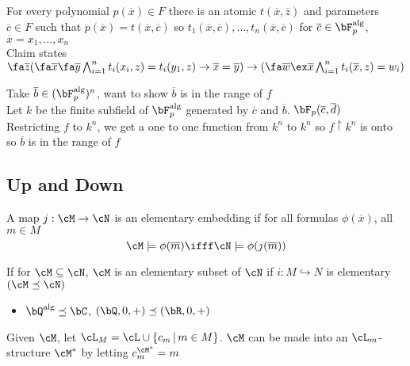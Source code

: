 \noindent
For every polynomial $p(\overline{x}) \in F$ there is an atomic $t(\overline{x}, \overline{z})$ and parameters $\overline{c} \in F$ such that $p(\overline{x}) = t(\overline{x}, \overline{c})$ so $t_1(\overline{x}, \overline{c}), \ldots, t_n(\overline{x}, \overline{c})$ for $\overline{c}\in \bF_p^{\text{alg}}$, $\overline{x} = x_1, \ldots, x_n$ \\
Claim states $\fa \overline{z}( \fa \overline{x} \fa \overline{y} \bigwedge_{i=1}^n t_i(x_i, z) = t_i(y_1, z) \to \overline{x} = \overline{y}) \to (\fa \overline{w} \ex \overline{x} \bigwedge_{i=1}^n t_i(\overline{x}, z)=w_i)$ 

\begin{pf}[Pf of Claim]
    Take $\overline{b} \in (\bF_p^{\text{alg}})^n$, want to show $\overline{b}$ is in the range of $f$ \\
    Let $k$ be the finite subfield of $\bF_{p}^{\text{alg}}$ generated by $\overline{c}$ and $\overline{b}$. $\bF_p(\overline{c}, \overline{d})$ \\
    Restricting $f$ to $k^n$, we get a one to one function from $k^n$ to $k^n$ so $f\upharpoonright k^n$ is onto so $\overline{b}$ is in the range of $f$
\end{pf}

\subsection{Up and Down}

\begin{definition}
    A map $j: \cM \to \cN$ is an elementary embedding if for all formulas $\phi(\overline{x})$, all $m \in M$ 
    \[\cM \models \phi(\overline{m}) \ifff \cN \models \phi(j(\overline{m})) \]
\end{definition}

\begin{definition}
    If for $\cM \subseteq \cN$, $\cM$ is an elementary subset of $\cN$ if $i: M \hookrightarrow N$ is elementary $(\cM \preceq \cN)$ 
\end{definition}

\begin{itemize}
    \item $\bQ^{\text{alg}} \preceq \bC$, $(\bQ, 0, + ) \preceq (\bR, 0, +)$ 
\end{itemize}

\begin{definition}
    Given $\cM$, let $\cL_M = \cL \cup \{ c_m \, | \, m \in M\}$. $\cM$ can be made into an $\cL_m$-structure $\cM^*$ by letting $c_m^{\cM^*} = m$
\end{definition}

